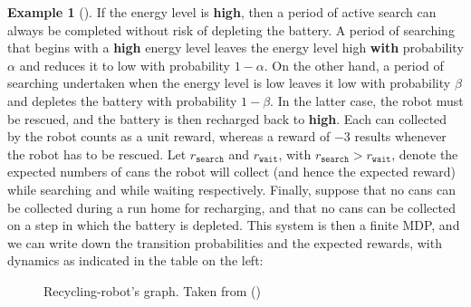 \documentclass[
  letterpaper,
]{krantz}
\theoremstyle{plain}
\theoremstyle{definition}
\newtheorem{example}{Example}[chapter]
\theoremstyle{definition}
\theoremstyle{remark}
\begin{document}
\begin{example}[]
If the energy level is \textbf{high}, then a period of active search can
always be completed without risk of depleting the battery. A period of
searching that begins with a \textbf{high} energy level leaves the
energy level high \textbf{with} probability \(\alpha\) and reduces it to
low with probability \(1 - \alpha\). On the other hand, a period of
searching undertaken when the energy level is low leaves it low with
probability \(\beta\) and depletes the battery with probability
\(1 - \beta\). In the latter case, the robot must be rescued, and the
battery is then recharged back to \textbf{high}. Each can collected by
the robot counts as a unit reward, whereas a reward of \(-3\) results
whenever the robot has to be rescued. Let \(r_{\texttt{search}}\) and
\(r_{\texttt{wait}}\), with \(r_{\texttt{search}} > r_{\texttt{wait}}\),
denote the expected numbers of cans the robot will collect (and hence
the expected reward) while searching and while waiting respectively.
Finally, suppose that no cans can be collected during a run home for
recharging, and that no cans can be collected on a step in which the
battery is depleted. This system is then a finite MDP, and we can write
down the transition probabilities and the expected rewards, with
dynamics as indicated in the table on the left:

\begin{figure}


\caption{\label{fig-robot-diagram}Recycling-robot's graph. Taken from
()}


\end{figure}
\end{example}
\end{document}
